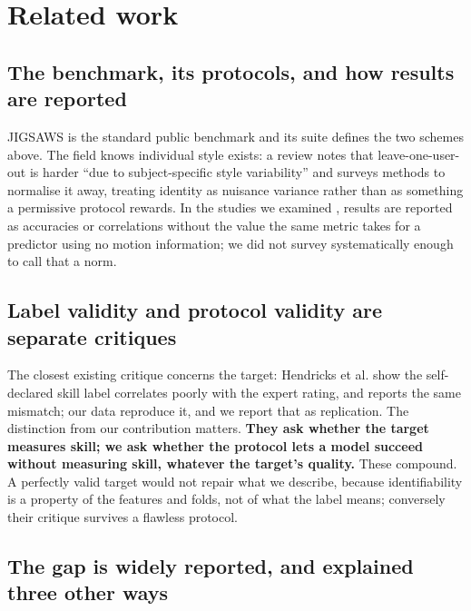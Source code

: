 \section{Related work}

\subsection{The benchmark, its protocols, and how results are reported}

JIGSAWS \cite{gao2014jigsaws} is the standard public benchmark and its suite \cite{ahmidi2017dataset} defines the two schemes above. The field knows individual style exists: a review notes that leave-one-user-out is harder ``due to subject-specific style variability'' \cite{vanamsterdam2021gesture} and surveys methods to normalise it away, treating identity as nuisance variance rather than as something a permissive protocol rewards. In the studies we examined \cite{zia2018automated,wang2021towards}, results are reported as accuracies or correlations without the value the same metric takes for a predictor using no motion information; we did not survey systematically enough to call that a norm.

\subsection{Label validity and protocol validity are separate critiques}

The closest existing critique concerns the target: Hendricks et al. \cite{hendricks2024exploring} show the self-declared skill label correlates poorly with the expert rating, and \cite{hoffmann2026looking} reports the same mismatch; our data reproduce it, and we report that as replication. The distinction from our contribution matters. \textbf{They ask whether the target measures skill; we ask whether the protocol lets a model succeed without measuring skill, whatever the target's quality.} These compound. A perfectly valid target would not repair what we describe, because identifiability is a property of the features and folds, not of what the label means; conversely their critique survives a flawless protocol.

\subsection{The gap is widely reported, and explained three other ways}


